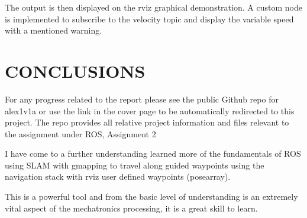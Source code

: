\documentclass[a4paper, 10pt]{IEEEconf}
\begin{document}
The output is then displayed on the rviz graphical demonstration. A custom node is implemented to subscribe to the velocity topic and display the variable speed with a mentioned warning.



\section{CONCLUSIONS}

For any progress related to the report please see the public Github repo for alex1v1a or use the link in the cover page to be automatically redirected to this project. The repo provides all relative project information and files relevant to the assignment under ROS, Assignment 2

I have come to a further understanding learned more of the fundamentals of ROS using  SLAM with gmapping to travel along guided waypoints using the navigation stack with rviz user defined waypoints (posearray).

This is a powerful tool and from the basic level of understanding is an extremely vital aspect of the mechatronics processing, it is a great skill to learn.

\clearpage
\nocite{*}




%
\end{document}
